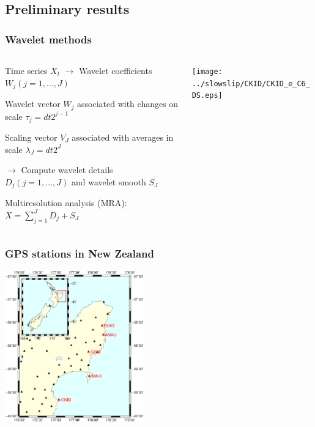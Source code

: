 \documentclass{beamer}
\begin{document}

	\subsection{Preliminary results}

	\begin{frame}
		\frametitle{Wavelet methods}
		\begin{columns}[c]
			\begin{column}{7cm}
			Time series $X_t$ $\rightarrow$ Wavelet coefficients $W_j (j = 1, ... , J)$

			\vspace{1em}

			Wavelet vector $W_j$ associated with changes on scale $\tau_j = dt 2^{j-1}$

			\vspace{1em}

			Scaling vector $V_J$ associated with averages in scale $\lambda_J = dt 2^J$

			\vspace{1em}

			$\rightarrow$ Compute wavelet details $D_j (j = 1, ... , J)$ and wavelet smooth $S_J$

			\vspace{1em}

			Multiresolution analysis (MRA): $X = \sum_{j = 1}^J D_j + S_J$
			\end{column}
			\begin{column}{5cm}
			\begin{center}
				\texttt{[image: ../slowslip/CKID/CKID\_e\_C6\_DS.eps]}
			\end{center}
			\end{column}
		\end{columns}
	\end{frame}

	\begin{frame}
		\frametitle{GPS stations in New Zealand}
		\begin{center}
			\includegraphics[trim={1cm 3cm 2cm 6cm}, clip, width=6cm]{Hikurangi/studyarea.eps}
		\end{center}
	\end{frame}
\end{document}
